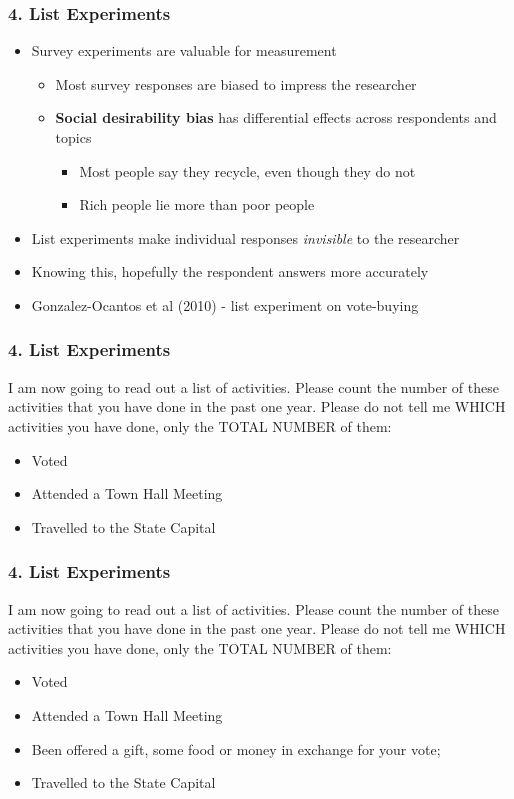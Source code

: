 \documentclass[xcolor=x11names,compress]{beamer}\usepackage[]{graphicx}\usepackage[]{color}
\renewcommand{\(}{\begin{columns}}
\renewcommand{\)}{\end{columns}}
\newcommand{\<}[1]{\begin{column}{#1}}
\renewcommand{\>}{\end{column}}
\begin{document}
\begin{frame}
\frametitle{4. List Experiments}
\begin{itemize}
\item Survey experiments are valuable for measurement
\pause
\begin{itemize}
\item Most survey responses are biased to impress the researcher
\pause
\item \textbf{Social desirability bias} has differential effects across respondents and topics
\begin{itemize}
\item Most people say they recycle, even though they do not
\pause
\item Rich people lie more than poor people
\end{itemize}
\pause
\end{itemize}
\item List experiments make individual responses \textit{invisible} to the researcher
\pause
\item Knowing this, hopefully the respondent answers more accurately
\pause
\item Gonzalez-Ocantos et al (2010) - list experiment on vote-buying
\end{itemize}
\end{frame}

\begin{frame}
\frametitle{4. List Experiments}
I am now going to read out a list of activities. Please count the number of these activities that you have done in the past one year. Please do not tell me WHICH activities you have done, only the TOTAL NUMBER of them: 
\begin{itemize}
\item Voted
\item Attended a Town Hall Meeting
\item Travelled to the State Capital
\end{itemize}
\end{frame}

\begin{frame}
\frametitle{4. List Experiments}
 I am now going to read out a list of activities. Please count the number of these activities that you have done in the past one year. Please do not tell me WHICH activities you have done, only the TOTAL NUMBER of them:
\begin{itemize}
\item Voted
\item Attended a Town Hall Meeting
\item Been offered a gift, some food or money in exchange for your vote; 
\item Travelled to the State Capital
\end{itemize}
\end{frame}
\end{document}
